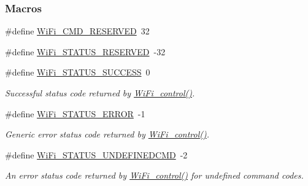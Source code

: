 \subsubsection*{Macros}
\begin{DoxyCompactItemize}
\item 
\#define \hyperlink{group___wi_fi___c_o_n_t_r_o_l_ga1f193fb2e462cfbfe8d5648c7b766710}{Wi\+Fi\+\_\+\+C\+M\+D\+\_\+\+R\+E\+S\+E\+R\+V\+E\+D}~32
\item 
\#define \hyperlink{group___wi_fi___c_o_n_t_r_o_l_ga2c7d9d0bec5da43eb7cc442f2f155399}{Wi\+Fi\+\_\+\+S\+T\+A\+T\+U\+S\+\_\+\+R\+E\+S\+E\+R\+V\+E\+D}~-\/32
\item 
\#define \hyperlink{group___wi_fi___s_t_a_t_u_s_ga02c176082ea8f3c0a258564269dffe71}{Wi\+Fi\+\_\+\+S\+T\+A\+T\+U\+S\+\_\+\+S\+U\+C\+C\+E\+S\+S}~0
\begin{DoxyCompactList}\small\item\em Successful status code returned by \hyperlink{_wi_fi_8h_a1f42a1e174ed1682b7de43ec6f043bf7}{Wi\+Fi\+\_\+control()}. \end{DoxyCompactList}\item 
\#define \hyperlink{group___wi_fi___s_t_a_t_u_s_ga3ad6de679b76f24a0fb86eb3299253ad}{Wi\+Fi\+\_\+\+S\+T\+A\+T\+U\+S\+\_\+\+E\+R\+R\+O\+R}~-\/1
\begin{DoxyCompactList}\small\item\em Generic error status code returned by \hyperlink{_wi_fi_8h_a1f42a1e174ed1682b7de43ec6f043bf7}{Wi\+Fi\+\_\+control()}. \end{DoxyCompactList}\item 
\#define \hyperlink{group___wi_fi___s_t_a_t_u_s_gac838b848572d4fdc52755592d2372f67}{Wi\+Fi\+\_\+\+S\+T\+A\+T\+U\+S\+\_\+\+U\+N\+D\+E\+F\+I\+N\+E\+D\+C\+M\+D}~-\/2
\begin{DoxyCompactList}\small\item\em An error status code returned by \hyperlink{_wi_fi_8h_a1f42a1e174ed1682b7de43ec6f043bf7}{Wi\+Fi\+\_\+control()} for undefined command codes. \end{DoxyCompactList}\end{DoxyCompactItemize}
